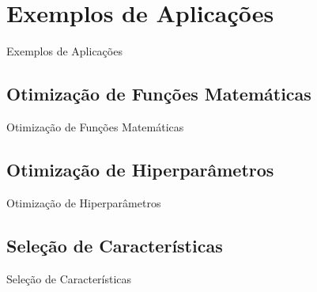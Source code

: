 \section{Exemplos de Aplicações}
\label{s.applications}

\begin{frame}{Exemplos de Aplicações}
\end{frame}

\subsection{Otimização de Funções Matemáticas}
\label{ss.applications_benchmark}

\begin{frame}{Otimização de Funções Matemáticas}
\end{frame}

\subsection{Otimização de Hiperparâmetros}
\label{ss.applications_hyperparameter}

\begin{frame}{Otimização de Hiperparâmetros}
\end{frame}

\subsection{Seleção de Características}
\label{ss.applications_feature_selection}

\begin{frame}{Seleção de Características}
\end{frame}